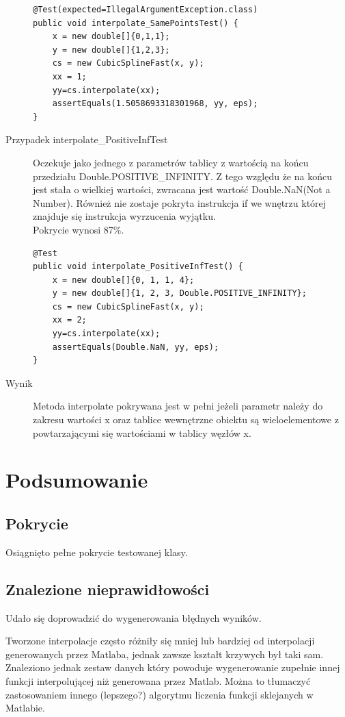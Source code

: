 \documentclass[12pt,a4paper,notitlepage]{article}
\begin{document}
\begin{description}
\begin{lstlisting}
@Test(expected=IllegalArgumentException.class)
public void interpolate_SamePointsTest() {
    x = new double[]{0,1,1};
    y = new double[]{1,2,3};
    cs = new CubicSplineFast(x, y);
    xx = 1;
    yy=cs.interpolate(xx);
    assertEquals(1.5058693318301968, yy, eps);
}
\end{lstlisting}

\item [Przypadek interpolate\_PositiveInfTest] Oczekuje jako jednego z parametrów tablicy z wartością na końcu przedziału Double.POSITIVE\_INFINITY. Z tego względu że na końcu jest stała o wielkiej wartości, zwracana jest wartość Double.NaN(Not a Number). Również nie zostaje pokryta instrukcja if we wnętrzu której znajduje się instrukcja wyrzucenia wyjątku.\\
Pokrycie wynosi 87\%.

\begin{lstlisting}
@Test
public void interpolate_PositiveInfTest() {
    x = new double[]{0, 1, 1, 4};
    y = new double[]{1, 2, 3, Double.POSITIVE_INFINITY};
    cs = new CubicSplineFast(x, y);
    xx = 2;
    yy=cs.interpolate(xx);
    assertEquals(Double.NaN, yy, eps);
}
\end{lstlisting}

\item [Wynik] Metoda interpolate pokrywana jest w pełni jeżeli parametr należy do zakresu wartości x oraz tablice wewnętrzne obiektu są wieloelementowe z powtarzającymi się wartościami w tablicy węzłów x.
\end{description}
\section{Podsumowanie}

\subsection{Pokrycie}

Osiągnięto pełne pokrycie testowanej klasy.

\subsection{Znalezione nieprawidłowości}

Udało się doprowadzić do wygenerowania błędnych wyników.

Tworzone interpolacje często różniły się mniej lub bardziej od interpolacji generowanych przez Matlaba, jednak zawsze kształt krzywych był taki sam. Znaleziono jednak zestaw danych który powoduje wygenerowanie zupełnie innej funkcji interpolującej niż generowana przez Matlab. Można to tłumaczyć zastosowaniem innego (lepszego?) algorytmu liczenia funkcji sklejanych w Matlabie.
\end{document}

